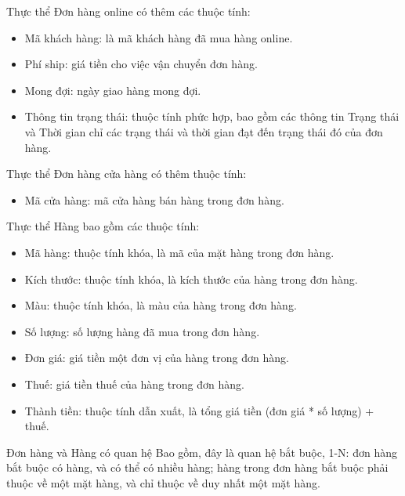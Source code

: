 \par Thực thể Đơn hàng online có thêm các thuộc tính:
\begin{itemize}
    \item Mã khách hàng: là mã khách hàng đã mua hàng online.
    \item Phí ship: giá tiền cho việc vận chuyển đơn hàng.
    \item Mong đợi: ngày giao hàng mong đợi.
    \item Thông tin trạng thái: thuộc tính phức hợp, bao gồm các thông tin Trạng thái và Thời gian chỉ các trạng thái và thời gian đạt đến trạng thái đó của đơn hàng.
\end{itemize}

\par Thực thể Đơn hàng cửa hàng có thêm thuộc tính:
\begin{itemize}
    \item Mã cửa hàng: mã cửa hàng bán hàng trong đơn hàng.
\end{itemize}

\par Thực thể Hàng bao gồm các thuộc tính:
\begin{itemize}
    \item Mã hàng: thuộc tính khóa, là mã của mặt hàng trong đơn hàng.
    \item Kích thước: thuộc tính khóa, là kích thước của hàng trong đơn hàng.
    \item Màu: thuộc tính khóa, là màu của hàng trong đơn hàng.
    \item Số lượng: số lượng hàng đã mua trong đơn hàng.
    \item Đơn giá: giá tiền một đơn vị của hàng trong đơn hàng.
    \item Thuế: giá tiền thuế của hàng trong đơn hàng.
    \item Thành tiền: thuộc tính dẫn xuất, là tổng giá tiền (đơn giá * số lượng) + thuế.
\end{itemize}

\par Đơn hàng và Hàng có quan hệ Bao gồm, đây là quan hệ bắt buộc, 1-N: đơn hàng bắt buộc có hàng, và có thể có nhiều hàng; hàng trong đơn hàng bắt buộc phải thuộc về một mặt hàng, và chỉ thuộc về duy nhất một mặt hàng.

